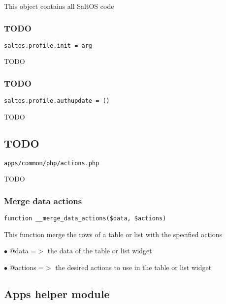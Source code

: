 \documentclass[a4paper]{article}
\begin{document}
This object contains all SaltOS code

\hypertarget{toc23}{}
\subsubsection{TODO}

\begin{lstlisting}
saltos.profile.init = arg
\end{lstlisting}

TODO

\hypertarget{toc24}{}
\subsubsection{TODO}

\begin{lstlisting}
saltos.profile.authupdate = ()
\end{lstlisting}

TODO

\hypertarget{toc25}{}
\subsection{TODO}

\begin{lstlisting}
apps/common/php/actions.php
\end{lstlisting}

TODO

\hypertarget{toc26}{}
\subsubsection{Merge data actions}

\begin{lstlisting}
function __merge_data_actions($data, $actions)
\end{lstlisting}

This function merge the rows of a table or list with the specified actions

\begin{compactitem}
\item[\color{myblue}$\bullet$] @data    =$>$ the data of the table or list widget
\item[\color{myblue}$\bullet$] @actions =$>$ the desired actions to use in the table or list widget
\end{compactitem}

\hypertarget{toc27}{}
\subsection{Apps helper module}
\end{document}
